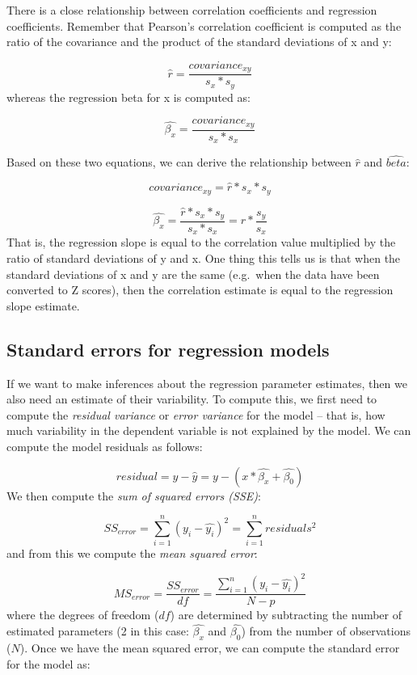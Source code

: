\documentclass[12pt,]{book}
\theoremstyle{definition}
\theoremstyle{definition}
\theoremstyle{definition}
\theoremstyle{remark}
\begin{document}
There is a close relationship between correlation coefficients and regression coefficients. Remember that Pearson's correlation coefficient is computed as the ratio of the covariance and the product of the standard deviations of x and y:

\[
\hat{r} = \frac{covariance_{xy}}{s_x * s_y}
\]
whereas the regression beta for x is computed as:

\[
\hat{\beta_x} = \frac{covariance_{xy}}{s_x*s_x}
\]

Based on these two equations, we can derive the relationship between \(\hat{r}\) and \(\hat{beta}\):

\[
covariance_{xy} = \hat{r} * s_x * s_y
\]

\[
\hat{\beta_x} =  \frac{\hat{r} * s_x * s_y}{s_x * s_x} = r * \frac{s_y}{s_x}
\]
That is, the regression slope is equal to the correlation value multiplied by the ratio of standard deviations of y and x. One thing this tells us is that when the standard deviations of x and y are the same (e.g.~when the data have been converted to Z scores), then the correlation estimate is equal to the regression slope estimate.

\hypertarget{standard-errors-for-regression-models}{%
\subsection{Standard errors for regression models}\label{standard-errors-for-regression-models}}

If we want to make inferences about the regression parameter estimates, then we also need an estimate of their variability. To compute this, we first need to compute the \emph{residual variance} or \emph{error variance} for the model -- that is, how much variability in the dependent variable is not explained by the model. We can compute the model residuals as follows:

\[
residual = y - \hat{y} = y - (x*\hat{\beta_x} + \hat{\beta_0})
\]
We then compute the \emph{sum of squared errors (SSE)}:

\[
SS_{error} = \sum_{i=1}^n{(y_i - \hat{y_i})^2} = \sum_{i=1}^n{residuals^2}
\]
and from this we compute the \emph{mean squared error}:

\[
MS_{error} = \frac{SS_{error}}{df} = \frac{\sum_{i=1}^n{(y_i - \hat{y_i})^2} }{N - p}
\]
where the degrees of freedom (\(df\)) are determined by subtracting the number of estimated parameters (2 in this case: \(\hat{\beta_x}\) and \(\hat{\beta_0}\)) from the number of observations (\(N\)). Once we have the mean squared error, we can compute the standard error for the model as:
\end{document}

